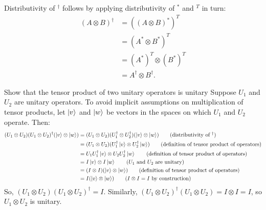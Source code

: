 \begin{comment}
\begin{align*}
	(A\otimes B)^T &=
	\begin{bmatrix}
		A_{11} B & \cdots & A_{1n} B \\
		\vdots & \ddots  & \vdots \\
		A_{m1}B & \cdots & A_{mn} B
	\end{bmatrix}^T \\
	&=
	\begin{bmatrix}
		A_{11} B^T & \cdots & A_{m1} B^T \\
		\vdots & \ddots  & \vdots \\
		A_{1n} B^T & \cdots & A_{mn} B^T
	\end{bmatrix} \\
	&=
	\begin{bmatrix}
		A_{11} B^T & \cdots & A_{1m} B^T \\
		\vdots & \ddots  & \vdots \\
		A_{n1} B^T & \cdots & A_{nm} B^T
	\end{bmatrix} \\
	&= A^T \otimes B^T.
\end{align*}
\end{comment}
Distributivity of $^\dagger$ follows by applying distributivity of $^*$ and $^T$ in turn:
\begin{align*}
	(A\otimes B)^\dagger&=((A \otimes B)^*)^T	\tag{definition of $\dagger$}\\
		&= (A^* \otimes B^*)^T \tag{distribute $^*$}\\
		&= (A^*)^T \otimes (B^*)^T \tag{distribute $^T$}\\
		&= A^\dagger \otimes B^\dagger \tag{definition of $^\dagger$}.
\end{align*}

 Show that the tensor product of two unitary operators is unitary
\Soln
Suppose $U_1$ and $U_2$ are unitary operators. To avoid implicit assumptions on multiplication of tensor products, let $\ket{v}$ and $\ket{w}$ be vectors in the spaces on which $U_1$ and $U_2$ operate.  Then:
\begin{align*}
	(U_1 \otimes U_2) (U_1 \otimes U_2)^\dagger(\ket{v}\otimes\ket{w}) &= (U_1 \otimes U_2) ( U_1^\dagger \otimes  U_2^\dagger)(\ket{v}\otimes\ket{w})\tag{distributivity of $^\dagger$} \\
	&=(U_1 \otimes U_2)(U_1^\dagger\ket{v}\otimes U_2^\dagger\ket{w}) \tag{definition of tensor product of operators} \\
	&=U_1U_1^\dagger\ket{v}\otimes U_2U_2^\dagger\ket{w} \tag{definition of tensor product of operators} \\
	&= I\ket{v} \otimes I\ket{w} \tag{$U_1$ and $U_2$ are unitary} \\
	&= (I\otimes I)(\ket{v}\otimes\ket{w}) \tag{definition of tensor product of operators} \\
	&= I(\ket{v}\otimes\ket{w}) \tag{$I\otimes I = I$ by construction}
\end{align*}
So, $(U_1\otimes U_2)(U_1\otimes U_2)^\dagger = I$. Similarly, $(U_1 \otimes U_2)^\dagger (U_1 \otimes U_2)  = I \otimes I =  I$, so $U_1\otimes U_2$ is unitary.

